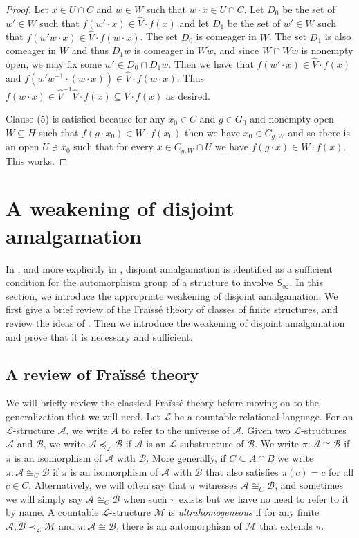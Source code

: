 \documentclass[12pt]{amsart}
\theoremstyle{plain}
\theoremstyle{definition}
\newcommand{\isom}{\cong}
\newcommand{\mcA}{\mathcal{A}}
\newcommand{\mcB}{\mathcal{B}}
\newcommand{\mcL}{\mathcal{L}}
\newcommand{\mcM}{\mathcal{M}}
\begin{document}
\begin{proof}
Let $x \in U \cap C$ and $w \in W$ such that $w \cdot x \in U \cap C$.
Let $D_0$ be the set of $w' \in W$ such that $f(w' \cdot x) \in \hat{V} \cdot f(x)$ and let $D_1$ be the set of $w' \in W$ such that $f(w'w \cdot x) \in \hat{V} \cdot f(w \cdot x)$.
The set $D_0$ is comeager in $W$.
The set $D_1$ is also comeager in $W$ and thus $D_1w$ is comeager in $Ww$, and since $W \cap Ww$ is nonempty open, we may fix some $w' \in D_0 \cap D_1w$.
Then we have that $f(w' \cdot x) \in \hat{V} \cdot f(x)$ and $f(w'w^{-1} \cdot (w \cdot x)) \in \hat{V} \cdot f(w \cdot x)$.
Thus $f(w \cdot x) \in \hat{V}^{-1}\hat{V} \cdot f(x) \subseteq V \cdot f(x)$ as desired.

Clause (5) is satisfied because for any $x_0 \in C$ and $g \in G_0$ and nonempty open $W \subseteq H$ such that $f(g \cdot x_0) \in W \cdot f(x_0)$ then we have $x_0 \in C_{g, W}$ and so there is an open $U \ni x_0$ such that for every $x \in C_{g, W} \cap U$ we have $f(g \cdot x) \in W \cdot f(x)$. This works.
\end{proof}




\section{A weakening of disjoint amalgamation}\label{sec:closure}

In \cite{Hjorth2002Knight}, and more explicitly in \cite{BFKL2016}, disjoint amalgamation is identified as a sufficient condition for the automorphism group of a structure to involve $S_\infty$.
In this section, we introduce the appropriate weakening of disjoint amalgamation.
We first give a brief review of the Fra\"{i}ss\'{e} theory of classes of finite structures, and review the ideas of \cite{BFKL2016}.
Then we introduce the weakening of disjoint amalgamation and prove that it is necessary and sufficient.

\subsection{A review of Fra\"{i}ss\'{e} theory}\label{ss:fraisse}

We will briefly review the classical Fra\"{i}ss\'{e} theory before moving on to the generalization that we will need.
Let $\mcL$ be a countable relational language.
For an $\mcL$-structure $\mcA$, we write $A$ to refer to the universe of $\mcA$.
Given two $\mcL$-structures $\mcA$ and $\mcB$, we write $\mcA \preceq_\mcL \mcB$ if $\mcA$ is an $\mcL$-substructure of $\mcB$.
We write $\pi : \mcA \isom \mcB$ if $\pi$ is an isomorphism of $\mcA$ with $\mcB$.
More generally, if $C \subseteq A \cap B$ we write $\pi : \mcA \isom_C \mcB$ if $\pi$ is an isomorphism of $\mcA$ with $\mcB$ that also satisfies $\pi(c) = c$ for all $c \in C$.
Alternatively, we will often say that $\pi$ witnesses $\mcA \isom_C \mcB$, and sometimes we will simply say $\mcA \isom_C \mcB$ when such $\pi$ exists but we have no need to refer to it by name.
A countable $\mcL$-structure $\mcM$ is \emph{ultrahomogeneous} if for any finite $\mcA, \mcB \prec_\mcL \mcM$ and $\pi : \mcA \isom \mcB$, there is an automorphism of $\mcM$ that extends $\pi$.
\end{document}
